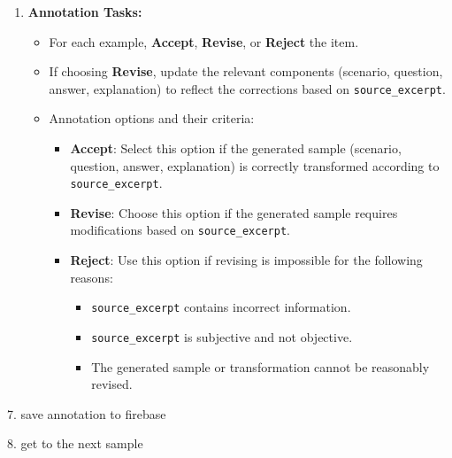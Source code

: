 \begin{enumerate}
    \item \textbf{Annotation Tasks:}
    \begin{itemize}
        \item For each example, \textbf{Accept}, \textbf{Revise}, or \textbf{Reject} the item.
        \item If choosing \textbf{Revise}, update the relevant components (scenario, question, answer, explanation) to reflect the corrections based on \texttt{source\_excerpt}.
        \item Annotation options and their criteria:
        \begin{itemize}
            \item \textbf{Accept}: Select this option if the generated sample (scenario, question, answer, explanation) is correctly transformed according to \texttt{source\_excerpt}.
            \item \textbf{Revise}: Choose this option if the generated sample requires modifications based on \texttt{source\_excerpt}.
            \item \textbf{Reject}: Use this option if revising is impossible for the following reasons:
            \begin{itemize}
                \item \texttt{source\_excerpt} contains incorrect information.
                \item \texttt{source\_excerpt} is subjective and not objective.
                \item The generated sample or transformation cannot be reasonably revised.
            \end{itemize}
        \end{itemize}
    \end{itemize}
\end{enumerate}

7. save annotation to firebase

8. get to the next sample

